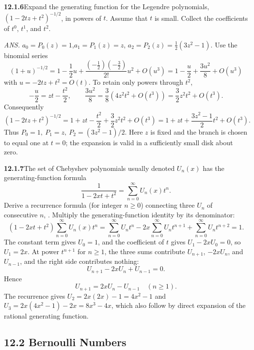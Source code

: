 \par\bigskip
\noindent\textbf{12.1.6}\quad Expand the generating function for the Legendre
polynomials, $(1-2tz+t^{2})^{-1/2}$, in powers of $t$. Assume that $t$ is
small. Collect the coefficients of $t^{0}$, $t^{1}$, and $t^{2}$.
\par\nobreak\hfill\emph{ANS.}\enspace
$a_{0}=P_{0}(z)=1$,\quad$a_{1}=P_{1}(z)=z$,\quad
$a_{2}=P_{2}(z)=\frac{1}{2}(3z^{2}-1)$.
\solution
Use the binomial series
\[
(1+u)^{-1/2}=1-\frac12u+\frac{(-\frac12)(-\frac32)}{2!}u^2+O(u^3)
=1-\frac u2+\frac{3u^2}8+O(u^3)
\]
with $u=-2tz+t^2=O(t)$. To retain only powers through $t^2$,
\[
-\frac u2=zt-\frac{t^2}2,\qquad
\frac{3u^2}{8}=\frac38(4z^2t^2+O(t^3))
=\frac32z^2t^2+O(t^3).
\]
Consequently
\[
(1-2tz+t^2)^{-1/2}
=1+zt-\frac{t^2}2+\frac32z^2t^2+O(t^3)
=1+zt+\frac{3z^2-1}{2}t^2+O(t^3).
\]
Thus $\boxed{P_0=1,\ P_1=z,\ P_2=(3z^2-1)/2}$.
Here $z$ is fixed and the branch is chosen to equal one at $t=0$;
the expansion is valid in a sufficiently small disk about zero.

\par\bigskip
\noindent\textbf{12.1.7}\quad The set of Chebyshev polynomials usually denoted
$U_{n}(x)$ has the generating-function formula
\[
\frac{1}{1-2xt+t^{2}}=\sum_{n=0}^{\infty}U_{n}(x)t^{n}.
\]
Derive a recurrence formula (for integer $n\ge0$) connecting three $U_{n}$ of
consecutive $n$, .
\solution
Multiply the generating-function identity by its denominator:
\[
(1-2xt+t^2)\sum_{n=0}^{\infty}U_n(x)t^n
=\sum_{n=0}^{\infty}U_nt^n-2x\sum_{n=0}^{\infty}U_nt^{n+1}
+\sum_{n=0}^{\infty}U_nt^{n+2}=1.
\]
The constant term gives $U_0=1$, and the coefficient of $t$ gives
$U_1-2xU_0=0$, so $U_1=2x$. At power $t^{n+1}$ for $n\ge1$, the three
sums contribute $U_{n+1}$, $-2xU_n$, and $U_{n-1}$, and the right side
contributes nothing:
\[
U_{n+1}-2xU_n+U_{n-1}=0.
\]
Hence
\[
\boxed{U_{n+1}=2xU_n-U_{n-1}\quad(n\ge1)}.
\]
The recurrence gives $U_2=2x(2x)-1=4x^2-1$ and
$U_3=2x(4x^2-1)-2x=8x^3-4x$, which also
follow by direct expansion of the rational generating function.

\subsection*{12.2 Bernoulli Numbers}

